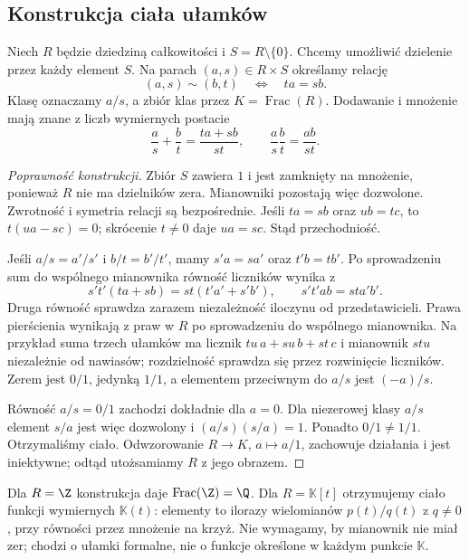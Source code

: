 \subsection*{Konstrukcja ciała ułamków}

\begin{definicja}
\label{def:cialo-ulamkow-5}
Niech $R$ będzie dziedziną całkowitości i $S=R\setminus\{0\}$.
Chcemy umożliwić dzielenie przez każdy element $S$.
Na parach $(a,s)\in R\times S$ określamy relację
\[
 (a,s)\sim(b,t)\quad\Longleftrightarrow\quad ta=sb.
\]
Klasę oznaczamy $a/s$, a zbiór klas przez $K=\operatorname{Frac}(R)$.
Dodawanie i mnożenie mają znane z liczb wymiernych postacie
\[
 \frac as+\frac bt=\frac{ta+sb}{st},\qquad
 \frac as\frac bt=\frac{ab}{st}.
\]
\end{definicja}

\begin{proof}[Poprawność konstrukcji]
Zbiór $S$ zawiera $1$ i jest zamknięty na mnożenie, ponieważ $R$
nie ma dzielników zera. Mianowniki pozostają więc dozwolone.
Zwrotność i symetria relacji są bezpośrednie. Jeśli $ta=sb$ oraz
$ub=tc$, to $t(ua-sc)=0$; skrócenie $t\ne0$ daje $ua=sc$.
Stąd przechodniość.

Jeśli $a/s=a'/s'$ i $b/t=b'/t'$, mamy $s'a=sa'$ oraz $t'b=tb'$.
Po sprowadzeniu sum do wspólnego mianownika równość liczników
wynika z
\[
 s't'(ta+sb)=st(t'a'+s'b'),
 \qquad s't'ab=sta'b'.
\]
Druga równość sprawdza zarazem niezależność iloczynu od przedstawicieli.
Prawa pierścienia wynikają z praw w $R$ po sprowadzeniu do wspólnego
mianownika. Na przykład suma trzech ułamków ma licznik
$tu\,a+su\,b+st\,c$ i mianownik $stu$ niezależnie od nawiasów;
rozdzielność sprawdza się przez rozwinięcie liczników.
Zerem jest $0/1$, jedynką $1/1$, a elementem przeciwnym do $a/s$ jest $(-a)/s$.

Równość $a/s=0/1$ zachodzi dokładnie dla $a=0$.
Dla niezerowej klasy $a/s$ element $s/a$ jest więc dozwolony
i $(a/s)(s/a)=1$. Ponadto $0/1\ne1/1$. Otrzymaliśmy ciało.
Odwzorowanie $R\to K$, $a\mapsto a/1$, zachowuje działania i jest
iniektywne; odtąd utożsamiamy $R$ z jego obrazem.
\end{proof}

\begin{przyklad}
Dla $R=\Z$ konstrukcja daje $\operatorname{Frac}(\Z)=\Q$.
Dla $R=\mathbb K[t]$ otrzymujemy ciało funkcji wymiernych
$\mathbb K(t)$: elementy to ilorazy wielomianów $p(t)/q(t)$ z
$q\ne0$, przy równości przez mnożenie na krzyż. Nie wymagamy,
by mianownik nie miał zer; chodzi o ułamki formalne, nie o funkcje
określone w każdym punkcie $\mathbb K$.
\end{przyklad}

